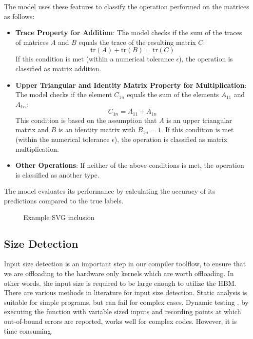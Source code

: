 \documentclass[manuscript,screen,review]{acmart}
\begin{document}
The model uses these features to classify the operation performed on the matrices as follows:

\begin{itemize}
	\item \textbf{Trace Property for Addition}: The model checks if the sum of the traces of matrices \(A\) and \(B\) equals the trace of the resulting matrix \(C\):
	\[
	\text{tr}(A) + \text{tr}(B) = \text{tr}(C)
	\]
	If this condition is met (within a numerical tolerance \(\epsilon\)), the operation is classified as matrix addition.
	
	\item \textbf{Upper Triangular and Identity Matrix Property for Multiplication}: The model checks if the element \(C_{1n}\) equals the sum of the elements \(A_{11}\) and \(A_{1n}\):
	\[
	C_{1n} = A_{11} + A_{1n}
	\]
	This condition is based on the assumption that \(A\) is an upper triangular matrix and \(B\) is an identity matrix with \(B_{1n} = 1\). If this condition is met (within the numerical tolerance \(\epsilon\)), the operation is classified as matrix multiplication.
	
	\item \textbf{Other Operations}: If neither of the above conditions is met, the operation is classified as another type.
\end{itemize}

The model evaluates its performance by calculating the accuracy of its predictions compared to the true labels.



\begin{figure}[h]
	\centering
	
	\caption{Example SVG inclusion}
	\label{fig:decision-tree}
\end{figure}


\subsection{Size Detection}
Input size detection is an important step in our compiler toolflow, to ensure that we are offloading to the hardware only kernels which are worth offloading. In other words, the input size is required to be large enough to utilize the HBM. There are various methods in literature for input size detection. Static analysis \cite{static} is suitable for simple programs, but can fail for complex cases. Dynamic testing \cite{ATC}, by executing the function with variable sized inputs and recording points at which out-of-bound errors are reported, works well for complex codes. However, it is time consuming.
\end{document}
